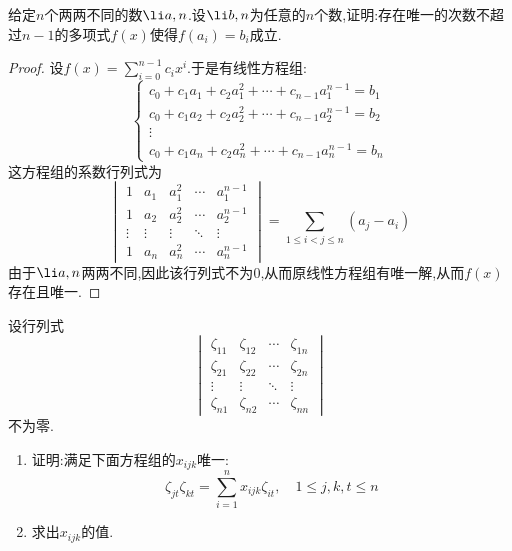 \documentclass{ctexart}
\begin{document}
\begin{problem}
    给定$n$个两两不同的数$\li a,n$.设$\li b,n$为任意的$n$个数,证明:存在唯一的次数不超过$n-1$的多项式$f(x)$使得$f\left(a_i\right)=b_i$成立.
\end{problem}
\begin{proof}
    设$f(x)=\displaystyle\sum_{i=0}^{n-1}c_ix^i$.于是有线性方程组:
    \[\left\{\begin{array}{c}
        c_0+c_1a_1+c_2a_1^2+\cdots+c_{n-1}a_1^{n-1}=b_1\\
        c_0+c_1a_2+c_2a_2^2+\cdots+c_{n-1}a_2^{n-1}=b_2\\
        \vdots\\
        c_0+c_1a_n+c_2a_n^2+\cdots+c_{n-1}a_n^{n-1}=b_n
    \end{array}\right.\]
    这方程组的系数行列式为
    \[\begin{vmatrix}
        1&a_1&a_1^2&\cdots&a_1^{n-1}\\
        1&a_2&a_2^2&\cdots&a_2^{n-1}\\
        \vdots&\vdots&\vdots&\ddots&\vdots\\
        1&a_n&a_n^2&\cdots&a_n^{n-1}
    \end{vmatrix}=\sum_{1\leqslant i<j\leqslant n}\left(a_j-a_i\right)\]
    由于$\li a,n$两两不同,因此该行列式不为$0$,从而原线性方程组有唯一解,从而$f(x)$存在且唯一.
\end{proof}
\begin{problem}
    设行列式
    \[\begin{vmatrix}
        \zeta_{11}&\zeta_{12}&\cdots&\zeta_{1n}\\
        \zeta_{21}&\zeta_{22}&\cdots&\zeta_{2n}\\
        \vdots&\vdots&\ddots&\vdots\\
        \zeta_{n1}&\zeta_{n2}&\cdots&\zeta_{nn}
    \end{vmatrix}\]
    不为零.
    \begin{enumerate}[label=\tbf{\arabic*}.,topsep=0pt,parsep=0pt,itemsep=0pt,partopsep=0pt]
        \item 证明:满足下面方程组的$x_{ijk}$唯一:
            \[\zeta_{jt}\zeta_{kt}=\sum_{i=1}^{n}x_{ijk}\zeta_{it},\quad1\leqslant j,k,t\leqslant n\]
        \item 求出$x_{ijk}$的值.
    \end{enumerate}
\end{problem}
\end{document}
